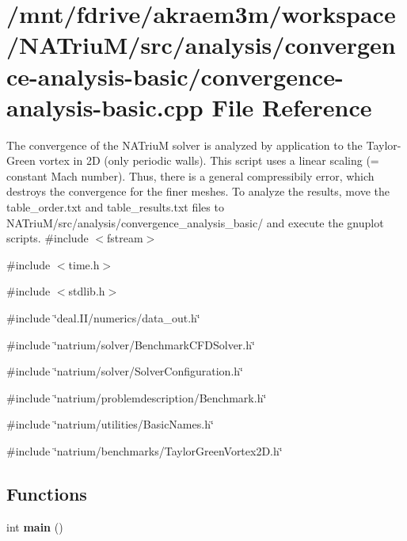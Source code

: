 \hypertarget{convergence-analysis-basic_8cpp}{
\section{/mnt/fdrive/akraem3m/workspace/NATriuM/src/analysis/convergence-\/analysis-\/basic/convergence-\/analysis-\/basic.cpp File Reference}
\label{convergence-analysis-basic_8cpp}
}


The convergence of the NATriuM solver is analyzed by application to the Taylor-\/Green vortex in 2D (only periodic walls). This script uses a linear scaling (= constant Mach number). Thus, there is a general compressibily error, which destroys the convergence for the finer meshes. To analyze the results, move the table\_\-order.txt and table\_\-results.txt files to NATriuM/src/analysis/convergence\_\-analysis\_\-basic/ and execute the gnuplot scripts.  
{\ttfamily \#include $<$fstream$>$}\par
{\ttfamily \#include $<$time.h$>$}\par
{\ttfamily \#include $<$stdlib.h$>$}\par
{\ttfamily \#include \char`\"{}deal.II/numerics/data\_\-out.h\char`\"{}}\par
{\ttfamily \#include \char`\"{}natrium/solver/BenchmarkCFDSolver.h\char`\"{}}\par
{\ttfamily \#include \char`\"{}natrium/solver/SolverConfiguration.h\char`\"{}}\par
{\ttfamily \#include \char`\"{}natrium/problemdescription/Benchmark.h\char`\"{}}\par
{\ttfamily \#include \char`\"{}natrium/utilities/BasicNames.h\char`\"{}}\par
{\ttfamily \#include \char`\"{}natrium/benchmarks/TaylorGreenVortex2D.h\char`\"{}}\par
\subsection*{Functions}
\begin{DoxyCompactItemize}
\item 
\hypertarget{convergence-analysis-basic_8cpp_ae66f6b31b5ad750f1fe042a706a4e3d4}{
int {\bfseries main} ()}
\label{convergence-analysis-basic_8cpp_ae66f6b31b5ad750f1fe042a706a4e3d4}

\end{DoxyCompactItemize}


